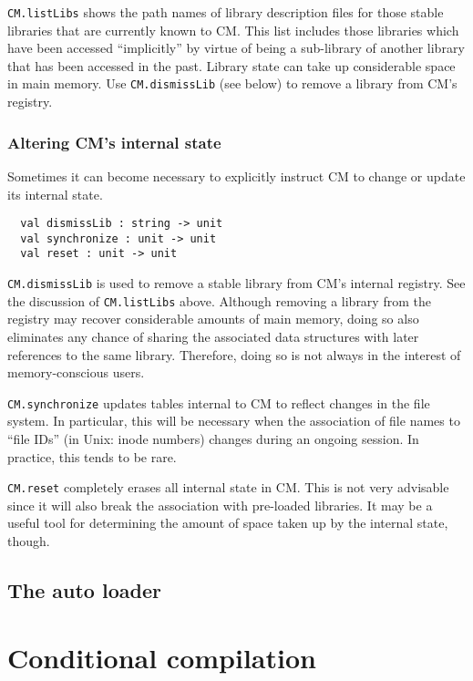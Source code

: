 \documentclass{article}
\begin{document}
{\tt CM.listLibs} shows the path names of library description files
for those stable libraries that are currently known to CM.  This list
includes those libraries which have been accessed ``implicitly'' by
virtue of being a sub-library of another library that has been
accessed in the past.  Library state can take up considerable space in
main memory.  Use {\tt CM.dismissLib} (see below) to remove a library
from CM's registry.

\subsubsection*{Altering CM's internal state}

Sometimes it can become necessary to explicitly instruct CM to change
or update its internal state.

\begin{verbatim}
  val dismissLib : string -> unit
  val synchronize : unit -> unit
  val reset : unit -> unit
\end{verbatim}

{\tt CM.dismissLib} is used to remove a stable library from CM's
internal registry.  See the discussion of {\tt CM.listLibs} above.
Although removing a library from the registry may recover considerable
amounts of main memory, doing so also eliminates any chance of sharing
the associated data structures with later references to the same
library.  Therefore, doing so is not always in the interest of
memory-conscious users.

{\tt CM.synchronize} updates tables internal to CM to reflect changes
in the file system.  In particular, this will be necessary when the
association of file names to ``file IDs'' (in Unix: inode numbers)
changes during an ongoing session.  In practice, this tends to be
rare.

{\tt CM.reset} completely erases all internal state in CM.  This is
not very advisable since it will also break the association with
pre-loaded libraries.  It may be a useful tool for determining the
amount of space taken up by the internal state, though.

\subsection{The auto loader}
\label{sec:autoload}

\section{Conditional compilation}
\label{sec:preproc}
\end{document}
